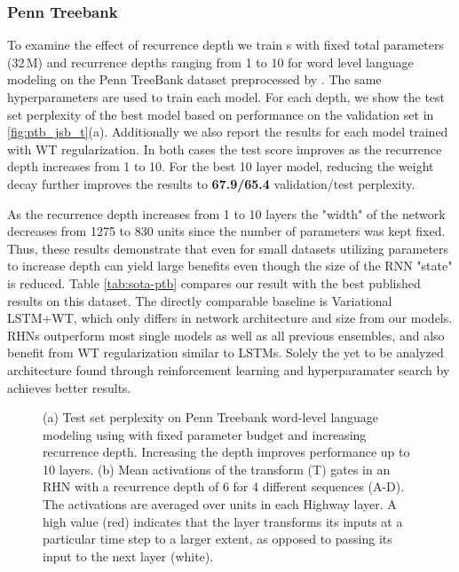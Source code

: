 \documentclass[letterpaper]{article}
\begin{document}
\subsubsection{Penn Treebank}
To examine the effect of recurrence depth we train \arch{}s with fixed total parameters (32\,M) and  recurrence depths ranging from 1 to 10 for word level language modeling on the Penn TreeBank dataset \citep{penntreebank} preprocessed by \citet{mikolov2010recurrent}.
The same hyperparameters are used to train each model.
For each depth, we show the test set perplexity of the best model based on performance on the validation set in \autoref{fig:ptb_jsb_t}(a).
Additionally we also report the results for each model trained with WT regularization.
In both cases the test score improves as the recurrence depth increases from 1 to 10.
For the best 10 layer model, reducing the weight decay further improves the results to \textbf{67.9/65.4} validation/test perplexity.

As the recurrence depth increases from 1 to 10 layers the "width" of the network decreases from 1275 to 830 units since the number of parameters was kept fixed. 
Thus, these results demonstrate that even for small datasets utilizing parameters to increase depth can yield large benefits even though the size of the RNN "state" is reduced.
Table \ref{tab:sota-ptb} compares our result with the best published results on this dataset.
The directly comparable baseline is Variational LSTM+WT, which only differs in network architecture and size
from our models.
RHNs outperform most single models as well as all previous ensembles, and also benefit from WT regularization similar to LSTMs. 
Solely the yet to be analyzed architecture found through reinforcement learning and hyperparamater search by \citet{zoph2016neural} achieves better results. 

\begin{figure*}[t]
\centering
  \hfill
   \caption{(a) Test set perplexity on Penn Treebank word-level language modeling using  with fixed parameter budget and increasing recurrence depth. Increasing the depth improves performance up to 10 layers. (b) Mean activations of the transform (T) gates in an RHN with a recurrence depth of 6 for 4 different sequences (A-D). The activations are averaged over units in each Highway layer. A high value (red) indicates that the layer transforms its inputs at a particular time step to a larger extent, as opposed to passing its input to the next layer (white).}
   \label{fig:ptb_jsb_t}
\end{figure*}
\end{document}
